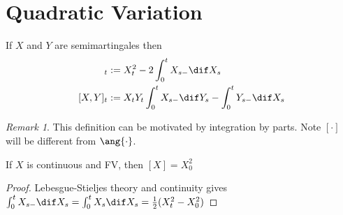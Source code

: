 \documentclass{scrreprt}
\theoremstyle{remark}
\newtheorem{remark}{Remark}
\newcommand\defeq{:=}
\begin{document}
\section{Quadratic Variation}

\begin{defn}
	If $X$ and $Y$ are semimartingales then
	\begin{align}
		[X]_t &\defeq X_t^2 - 2\int_0^t X_{s-} \dif X_s \\
		[X, Y]_t &\defeq X_t Y_t \int_0^t X_{s-} \dif Y_s - \int_0^t Y_{s-} \dif X_s
	\end{align}
\end{defn}
\begin{remark}
	This definition can be motivated by integration by parts. Note $[\cdot]$ will be different from $\ang{\cdot}$.
\end{remark}

\begin{prop}
	If $X$ is continuous and FV, then $[X] = X_0^2$
\end{prop}
\begin{proof}
	Lebesgue-Stieljes theory and continuity gives $\int_0^t X_{s-} \dif X_s = \int_0^t X_s \dif X_s = \frac{1}{2}(X_t^2 - X_0^2)$
\end{proof}
\end{document}
